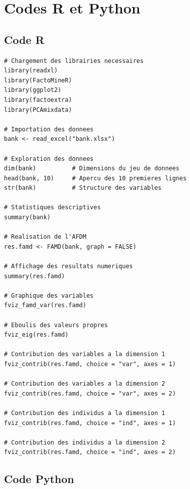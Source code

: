 \documentclass[12pt,a4paper]{article}
\begin{document}
\section{Codes R et Python}

\subsection{Code R}

\begin{lstlisting}[style=Rstyle, caption={Code R pour l'AFDM avec FactoMineR et factoextra}]
# Chargement des librairies necessaires
library(readxl)
library(FactoMineR)
library(ggplot2)
library(factoextra)
library(PCAmixdata)

# Importation des donnees
bank <- read_excel("bank.xlsx")

# Exploration des donnees
dim(bank)          # Dimensions du jeu de donnees
head(bank, 10)     # Apercu des 10 premieres lignes
str(bank)          # Structure des variables

# Statistiques descriptives
summary(bank)

# Realisation de l'AFDM
res.famd <- FAMD(bank, graph = FALSE)

# Affichage des resultats numeriques
summary(res.famd)

# Graphique des variables
fviz_famd_var(res.famd)

# Eboulis des valeurs propres
fviz_eig(res.famd)

# Contribution des variables a la dimension 1
fviz_contrib(res.famd, choice = "var", axes = 1)

# Contribution des variables a la dimension 2
fviz_contrib(res.famd, choice = "var", axes = 2)

# Contribution des individus a la dimension 1
fviz_contrib(res.famd, choice = "ind", axes = 1)

# Contribution des individus a la dimension 2
fviz_contrib(res.famd, choice = "ind", axes = 2)
\end{lstlisting}

\subsection{Code Python}
\end{document}
